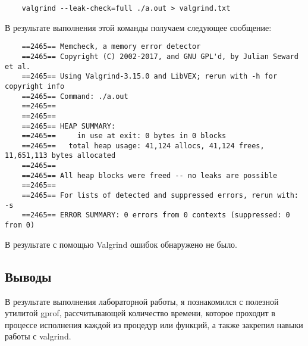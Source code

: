 \documentclass[12pt]{article}
\begin{document}
\begin{lstlisting}
    valgrind --leak-check=full ./a.out > valgrind.txt
\end{lstlisting}

В результате выполнения этой команды получаем следующее сообщение:

\begin{lstlisting}
    ==2465== Memcheck, a memory error detector
    ==2465== Copyright (C) 2002-2017, and GNU GPL'd, by Julian Seward et al.
    ==2465== Using Valgrind-3.15.0 and LibVEX; rerun with -h for copyright info
    ==2465== Command: ./a.out
    ==2465== 
    ==2465== 
    ==2465== HEAP SUMMARY:
    ==2465==     in use at exit: 0 bytes in 0 blocks
    ==2465==   total heap usage: 41,124 allocs, 41,124 frees, 11,651,113 bytes allocated
    ==2465== 
    ==2465== All heap blocks were freed -- no leaks are possible
    ==2465== 
    ==2465== For lists of detected and suppressed errors, rerun with: -s
    ==2465== ERROR SUMMARY: 0 errors from 0 contexts (suppressed: 0 from 0)
\end{lstlisting}

В результате с помощью Valgrind ошибок обнаружено не было.

\subsection*{Выводы}

В результате выполнения лабораторной работы, я познакомился с полезной утилитой gprof, рассчитывающей количество времени, 
которое проходит в процессе исполнения каждой из процедур или функций, а также
закрепил навыки работы с valgrind.
\end{document}
